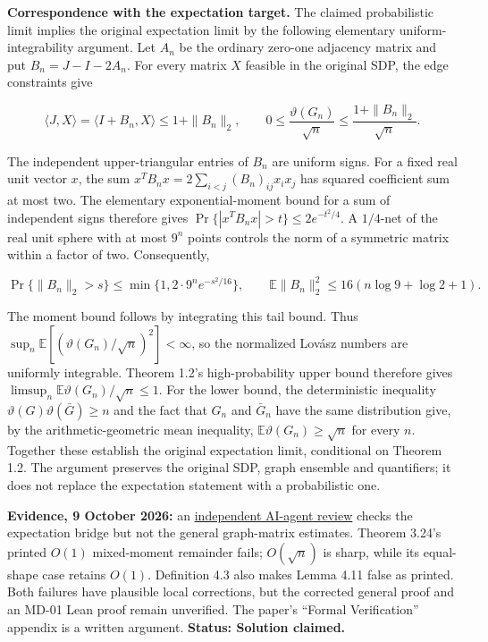 \documentclass[11pt,a4paper]{article}
\begin{document}
\textbf{Correspondence with the expectation target.} The claimed
probabilistic limit implies the original expectation limit by the
following elementary uniform-integrability argument. Let \(A_n\) be the
ordinary zero-one adjacency matrix and put \(B_n=J-I-2A_n\). For every
matrix \(X\) feasible in the original SDP, the edge constraints give

\[\langle J,X\rangle=\langle I+B_n,X\rangle
\le1+\|B_n\|_2,
\qquad
0\le\frac{\vartheta(G_n)}{\sqrt n}
\le\frac{1+\|B_n\|_2}{\sqrt n}.\]

The independent upper-triangular entries of \(B_n\) are uniform signs.
For a fixed real unit vector \(x\), the sum
\(x^TB_nx=2\sum_{i< j}(B_n)_{ij}x_ix_j\) has squared coefficient sum at
most two. The elementary exponential-moment bound for a sum of
independent signs therefore gives \(\Pr\{|x^TB_nx|>t\}\le2e^{-t^2/4}\).
A \(1/4\)-net of the real unit sphere with at most \(9^n\) points
controls the norm of a symmetric matrix within a factor of two.
Consequently,

\[\Pr\{\|B_n\|_2>s\}
\le\min\{1,2\cdot9^n e^{-s^2/16}\},
\qquad
\mathbb E\|B_n\|_2^2
\le16(n\log9+\log2+1).\]

The moment bound follows by integrating this tail bound. Thus
\(\sup_n\mathbb E[(\vartheta(G_n)/\sqrt n)^2]<\infty\), so the
normalized Lovász numbers are uniformly integrable. Theorem 1.2's
high-probability upper bound therefore gives
\(\limsup_n\mathbb E\vartheta(G_n)/\sqrt n\le1\). For the lower bound,
the deterministic inequality \(\vartheta(G)\vartheta(\bar G)\ge n\) and
the fact that \(G_n\) and \(\bar G_n\) have the same distribution give,
by the arithmetic-geometric mean inequality,
\(\mathbb E\vartheta(G_n)\ge\sqrt n\) for every \(n\). Together these
establish the original expectation limit, conditional on Theorem 1.2.
The argument preserves the original SDP, graph ensemble and quantifiers;
it does not replace the expectation statement with a probabilistic one.

\textbf{Evidence, 9 October 2026:} an
\href{https://github.com/ajt60gaibb/OpenProblemsInNLA/blob/main/reviews/2026-10-08-claimed-solutions/MD-01.md}{independent
AI-agent review} checks the expectation bridge but not the general
graph-matrix estimates. Theorem 3.24's printed \(O(1)\) mixed-moment
remainder fails; \(O(\sqrt n)\) is sharp, while its equal-shape case
retains \(O(1)\). Definition 4.3 also makes Lemma 4.11 false as printed.
Both failures have plausible local corrections, but the corrected
general proof and an MD-01 Lean proof remain unverified. The paper's
``Formal Verification'' appendix is a written argument. \textbf{Status:
Solution claimed.}
\end{document}
